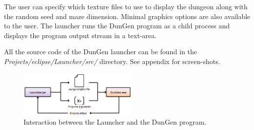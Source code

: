 The user can specify which texture files to use to display the dungeon along with the random seed and maze dimension. Minimal graphics options are also available to the user. The launcher runs the DunGen program as a child process and displays the program output stream in a text-area.

All the source code of the DunGen launcher can be found in the {\em Projects/eclipse/Launcher/src/} directory. See appendix for screen-shots.

\begin{figure}[h!]
\centering
 \includegraphics[width=0.52\textwidth]{images/launcherAndDungen.png}
\caption{Interaction between the Launcher and the DunGen program.}
\end{figure}